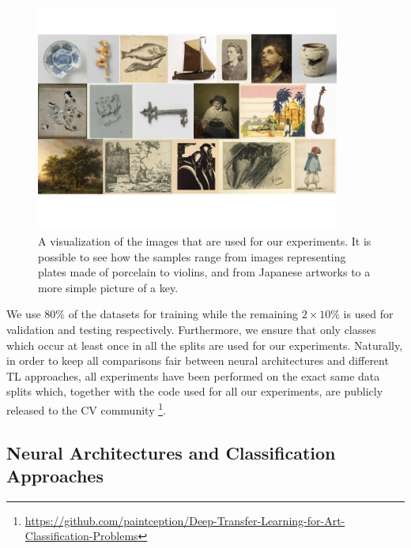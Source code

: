 


\begin{figure}
\centering
  \includegraphics[width=10cm]{./Images/Chapter03/datasets.jpg}\vspace{-1cm}
  \caption{A visualization of the images that are used for our experiments. It is possible to see how the samples range from images representing plates made of porcelain to violins, and from Japanese artworks to a more simple picture of a key.}
  \label{fig:datasets}
\end{figure}

We use $80\%$ of the datasets for training while the remaining $2 \times 10\%$ is used for validation and testing respectively. Furthermore, we ensure that only classes which occur at least once in all the splits are used for our experiments. Naturally, in order to keep all comparisons fair between neural architectures and different TL approaches, all experiments have been performed on the exact same data splits which, together with the code used for all our experiments, are publicly released to the CV community \footnote{\url{https://github.com/paintception/Deep-Transfer-Learning-for-Art-Classification-Problems}}. 

\subsection{Neural Architectures and Classification Approaches}
\label{subsec: neural_nets}

